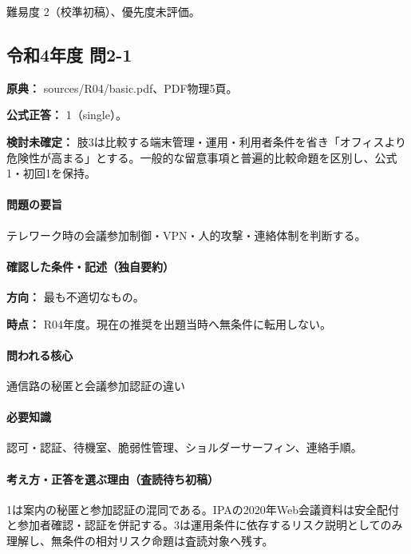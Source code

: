 \par 難易度 2（校準初稿）、優先度未評価。

\subsection{令和4年度 問2-1}
\label{q:r04-reg-basic-2-1}

\noindent\textbf{原典：} sources/R04/basic.pdf、PDF物理5頁。

\textbf{公式正答：} 1（single）。

\par\textbf{検討未確定：} 肢3は比較する端末管理・運用・利用者条件を省き「オフィスより危険性が高まる」とする。一般的な留意事項と普遍的比較命題を区別し、公式1・初回1を保持。

\paragraph{問題の要旨} テレワーク時の会議参加制御・VPN・人的攻撃・連絡体制を判断する。

\paragraph{確認した条件・記述（独自要約）}\mbox{}\par

\noindent\textbf{方向：} 最も不適切なもの。\par

\noindent\textbf{時点：} R04年度。現在の推奨を出題当時へ無条件に転用しない。\par

\paragraph{問われる核心} 通信路の秘匿と会議参加認証の違い

\paragraph{必要知識} 認可・認証、待機室、脆弱性管理、ショルダーサーフィン、連絡手順。

\paragraph{考え方・正答を選ぶ理由（査読待ち初稿）} 1は案内の秘匿と参加認証の混同である。IPAの2020年Web会議資料は安全配付と参加者確認・認証を併記する。3は運用条件に依存するリスク説明としてのみ理解し、無条件の相対リスク命題は査読対象へ残す。


